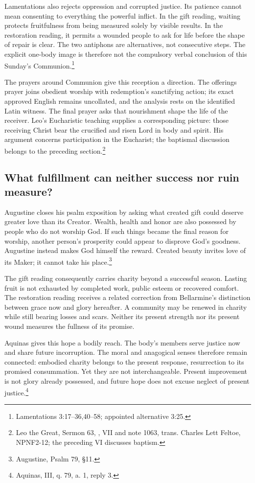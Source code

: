 Lamentations also rejects oppression and corrupted justice. Its patience cannot mean consenting to everything the powerful inflict. In the gift reading, waiting protects fruitfulness from being measured solely by visible results. In the restoration reading, it permits a wounded people to ask for life before the shape of repair is clear. The two antiphons are alternatives, not consecutive steps. The explicit one-body image is therefore not the compulsory verbal conclusion of this Sunday's Communion.\footnote{Lamentations 3:17--36,40--58; appointed alternative 3:25.}

The prayers around Communion give this reception a direction. The offerings prayer joins obedient worship with redemption's sanctifying action; its exact approved English remains uncollated, and the analysis rests on the identified Latin witness. The final prayer asks that nourishment shape the life of the receiver. Leo's Eucharistic teaching supplies a corresponding picture: those receiving Christ bear the crucified and risen Lord in body and spirit. His argument concerns participation in the Eucharist; the baptismal discussion belongs to the preceding section.\footnote{Leo the Great, Sermon 63, , VII and note 1063, trans. Charles Lett Feltoe, NPNF2-12; the preceding VI discusses baptism.}

\subsection{What fulfillment can neither success nor ruin measure?}
Augustine closes his psalm exposition by asking what created gift could deserve greater love than its Creator. Wealth, health and honor are also possessed by people who do not worship God. If such things became the final reason for worship, another person's prosperity could appear to disprove God's goodness. Augustine instead makes God himself the reward. Created beauty invites love of its Maker; it cannot take his place.\footnote{Augustine, Psalm 79, §11.}

The gift reading consequently carries charity beyond a successful season. Lasting fruit is not exhausted by completed work, public esteem or recovered comfort. The restoration reading receives a related correction from Bellarmine's distinction between grace now and glory hereafter. A community may be renewed in charity while still bearing losses and scars. Neither its present strength nor its present wound measures the fullness of its promise.

Aquinas gives this hope a bodily reach. The body's members serve justice now and share future incorruption. The moral and anagogical senses therefore remain connected: embodied charity belongs to the present response, resurrection to its promised consummation. Yet they are not interchangeable. Present improvement is not glory already possessed, and future hope does not excuse neglect of present justice.\footnote{Aquinas, III, q. 79, a. 1, reply 3.}

